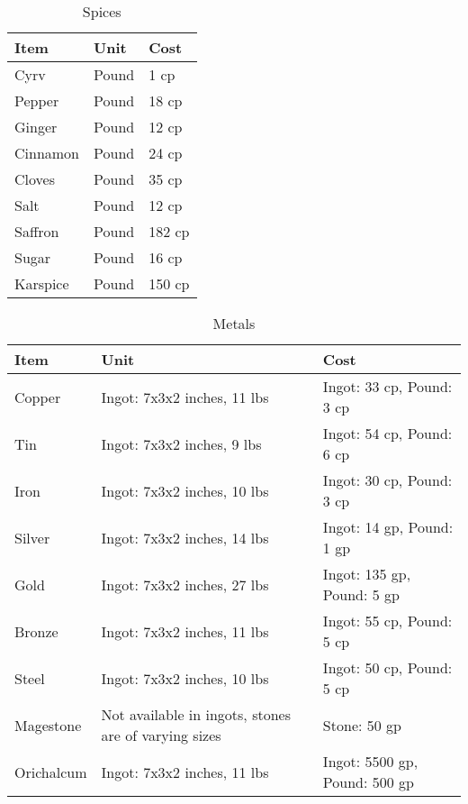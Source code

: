 \documentclass[oneside,11pt,english]{book}
\begin{document}
\begin{table}[hb]
  \centering
  \caption{Spices}
  \label{tab:Spices}
  \begin{tabu} spread 0pt {*{3}{X[-1]}}
    Item &Unit &Cost\\\toprule
    Cyrv &Pound &1 cp\\
    Pepper &Pound &18 cp\\
    Ginger &Pound &12 cp\\
    Cinnamon &Pound &24 cp\\
    Cloves &Pound &35 cp\\
    Salt &Pound &12 cp\\
    Saffron &Pound &182 cp\\
    Sugar &Pound &16 cp\\
    Karspice &Pound &150 cp\\
  \end{tabu}
\end{table}

\begin{table}[hb]
  \centering
  \caption{Metals}
  \label{tab:Metals}
  \begin{tabu} spread 0pt {*{3}{X[-1]}}
    Item &Unit &Cost\\\toprule
    Copper &Ingot: 7x3x2 inches, 11 lbs &Ingot: 33 cp, Pound: 3 cp\\
    Tin &Ingot: 7x3x2 inches, 9 lbs &Ingot: 54 cp, Pound: 6 cp\\
    Iron &Ingot: 7x3x2 inches, 10 lbs &Ingot: 30 cp, Pound: 3 cp\\
    Silver &Ingot: 7x3x2 inches, 14 lbs &Ingot: 14 gp, Pound: 1 gp\\
    Gold &Ingot: 7x3x2 inches, 27 lbs &Ingot: 135 gp, Pound: 5 gp\\
    Bronze &Ingot: 7x3x2 inches, 11 lbs &Ingot: 55 cp, Pound: 5 cp\\
    Steel &Ingot: 7x3x2 inches, 10 lbs &Ingot: 50 cp, Pound: 5 cp\\
    Magestone &Not available in ingots, stones are of varying sizes &Stone: 50 gp\\
    Orichalcum &Ingot: 7x3x2 inches, 11 lbs &Ingot: 5500 gp, Pound: 500 gp\\
  \end{tabu}
\end{table}
\end{document}
